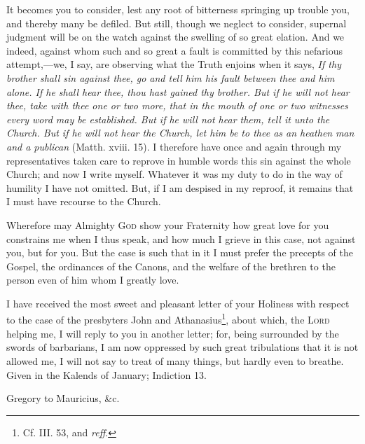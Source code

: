 It becomes you to consider, lest any root of bitterness springing up trouble you, and thereby many be defiled. But still, though we neglect to consider, supernal judgment will be on the watch against the swelling of so great elation. And we indeed, against whom such and so great a fault is committed by this nefarious attempt,—we, I say, are observing what the Truth enjoins when it says, \emph{If thy brother shall sin against thee, go and tell him his fault between thee and him alone. If he shall hear thee, thou hast gained thy brother. But if he will not hear thee, take with thee one or two more, that in the mouth of one or two witnesses every word may be established. But if he will not hear them, tell it unto the Church. But if he will not hear the Church, let him be to thee as an heathen} \emph{man and a publican} (Matth. xviii. 15). I therefore have once and again through my representatives taken care to reprove in humble words this sin against the whole Church; and now I write myself. Whatever it was my duty to do in the way of humility I have not omitted. But, if I am despised in my reproof, it remains that I must have recourse to the Church.

Wherefore may Almighty \textsc{God} show your Fraternity how great love for you constrains me when I thus speak, and how much I grieve in this case, not against you, but for you. But the case is such that in it I must prefer the precepts of the Gospel, the ordinances of the Canons, and the welfare of the brethren to the person even of him whom I greatly love.

I have received the most sweet and pleasant letter of your Holiness with respect to the case of the presbyters John and Athanasius\footnote{Cf. III. 53, and \emph{reff}.}, about which, the \textsc{Lord} helping me, I will reply to you in another letter; for, being surrounded by the swords of barbarians, I am now oppressed by such great tribulations that it is not allowed me, I will not say to treat of many things, but hardly even to breathe. Given in the Kalends of January; Indiction 13.


Gregory to Mauricius, \&c.

